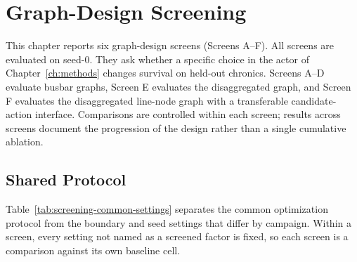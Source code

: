\chapter{Graph-Design Screening}
\label{ch:experiments}

This chapter reports
six graph-design screens (Screens A--F). All screens are evaluated on
seed-0. They ask whether
a specific choice in the actor of Chapter~\ref{ch:methods} changes survival on held-out chronics.
Screens A--D evaluate busbar graphs, Screen E evaluates the
disaggregated graph, and Screen F evaluates the disaggregated line-node graph
with a transferable candidate-action interface. Comparisons are controlled
within each screen; results across screens document the progression of the
design rather than a single cumulative ablation. 

% 
\section{Shared Protocol}
\label{sec:screening-common-protocol}

Table~\ref{tab:screening-common-settings} separates the common optimization
protocol from the boundary and seed settings that differ by campaign. Within a
screen, every setting not named as a screened factor is fixed, so each screen
is a comparison against its own baseline cell.

